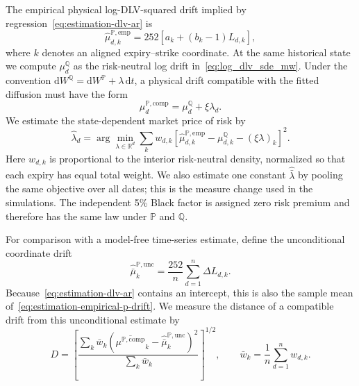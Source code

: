 \documentclass[11pt]{article}
\newcommand{\R}{\mathbb R}
\newcommand{\Q}{\mathbb Q}
\newcommand{\PP}{\mathbb P}
\newcommand{\dd}{\mathrm d}
\theoremstyle{plain}
\theoremstyle{definition}
\theoremstyle{remark}
\begin{document}
The empirical physical log-DLV-squared drift implied by
regression~\eqref{eq:estimation-dlv-ar} is
\begin{equation}
  \label{eq:estimation-empirical-p-drift}
  \widehat\mu_{d,k}^{\PP,\mathrm{emp}}
  =252\left[a_k+(b_k-1)L_{d,k}\right],
\end{equation}
where $k$ denotes an aligned expiry--strike coordinate.  At the same
historical state we compute $\mu_d^\Q$ as the risk-neutral log drift
in~\eqref{eq:log_dlv_sde_mw}.  Under the convention
$\dd W^\Q=\dd W^\PP+\lambda\,\dd t$, a physical drift compatible with the
fitted diffusion must have the form
\begin{equation}
  \label{eq:numerics-p-drift}
  \mu_d^{\PP,\mathrm{comp}}=\mu_d^\Q+\xi\lambda_d.
\end{equation}
We estimate the state-dependent market price of risk by
\begin{equation}
  \label{eq:numerics-statewise-lambda}
  \widehat\lambda_d
  =\arg\min_{\lambda\in\R^d}
    \sum_k w_{d,k}
    \left[
      \widehat\mu_{d,k}^{\PP,\mathrm{emp}}-\mu_{d,k}^{\Q}
      -(\xi\lambda)_k
    \right]^2.
\end{equation}
Here $w_{d,k}$ is proportional to the interior risk-neutral density, normalized
so that each expiry has equal total weight.  We also estimate one constant
$\widehat{\bar\lambda}$ by pooling the same objective over all dates; this is
the measure change used in the simulations.  The independent 5\% Black factor
is assigned zero risk premium and therefore has the same law under $\PP$ and
$\Q$.

For comparison with a model-free time-series estimate, define the
unconditional coordinate drift
\begin{equation}
  \label{eq:estimation-unconditional-p-drift}
  \widehat{\bar\mu}^{\PP,\mathrm{unc}}_k
  =\frac{252}{n}\sum_{d=1}^n\Delta L_{d,k}.
\end{equation}
Because~\eqref{eq:estimation-dlv-ar} contains an intercept, this is also the
sample mean of~\eqref{eq:estimation-empirical-p-drift}.  We measure the distance
of a compatible drift from this unconditional estimate by
\begin{equation}
  \label{eq:estimation-unconditional-drift-distance}
  D
  =\left[
    \frac{\sum_k\bar w_k
      \left(\overline{\mu^{\PP,\mathrm{comp}}}_k
      -\widehat{\bar\mu}^{\PP,\mathrm{unc}}_k\right)^2}
    {\sum_k\bar w_k}
  \right]^{1/2},
  \qquad
  \bar w_k=\frac1n\sum_{d=1}^n w_{d,k}.
\end{equation}
\end{document}
